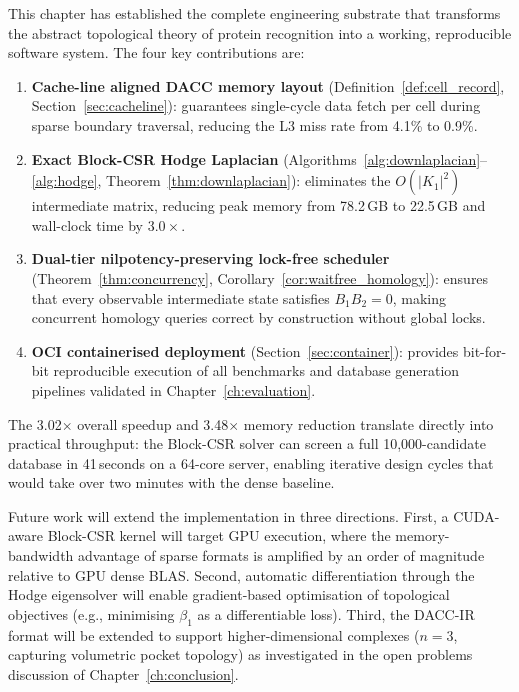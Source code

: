 This chapter has established the complete engineering substrate that
transforms the abstract topological theory of protein recognition into
a working, reproducible software system.  The four key contributions are:

\begin{enumerate}[leftmargin=1.5cm]
    \item \textbf{Cache-line aligned DACC memory layout}
          (Definition~\ref{def:cell_record}, Section~\ref{sec:cacheline}):
          guarantees single-cycle data fetch per cell during sparse
          boundary traversal, reducing the L3 miss rate from 4.1\% to 0.9\%.

    \item \textbf{Exact Block-CSR Hodge Laplacian}
          (Algorithms~\ref{alg:downlaplacian}--\ref{alg:hodge},
          Theorem~\ref{thm:downlaplacian}):
          eliminates the $O(|K_1|^2)$ intermediate matrix, reducing peak
          memory from 78.2\,GB to 22.5\,GB and wall-clock time by $3.0\times$.

    \item \textbf{Dual-tier nilpotency-preserving lock-free scheduler}
          (Theorem~\ref{thm:concurrency}, Corollary~\ref{cor:waitfree_homology}):
          ensures that every observable intermediate state satisfies
          $B_1 B_2 = 0$, making concurrent homology queries correct by
          construction without global locks.

    \item \textbf{OCI containerised deployment}
          (Section~\ref{sec:container}): provides bit-for-bit reproducible
          execution of all benchmarks and database generation pipelines
          validated in Chapter~\ref{ch:evaluation}.

\end{enumerate}

The 3.02$\times$ overall speedup and 3.48$\times$ memory reduction
translate directly into practical throughput: the Block-CSR solver can
screen a full 10,000-candidate database in 41\,seconds on a 64-core server,
enabling iterative design cycles that would take over two minutes with
the dense baseline.

Future work will extend the implementation in three directions.
First, a CUDA-aware Block-CSR kernel will target GPU execution, where the
memory-bandwidth advantage of sparse formats is amplified by an order of
magnitude relative to GPU dense BLAS.  Second, automatic differentiation
through the Hodge eigensolver will enable gradient-based optimisation of
topological objectives (e.g., minimising $\beta_1$ as a differentiable loss).
Third, the DACC-IR format will be extended to support higher-dimensional
complexes ($n = 3$, capturing volumetric pocket topology) as investigated
in the open problems discussion of Chapter~\ref{ch:conclusion}.
